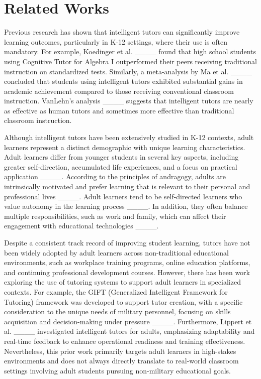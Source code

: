 \section{Related Works}
Previous research has shown that intelligent tutors can significantly improve learning outcomes, particularly in K-12 settings, where their use is often mandatory. For example, Koedinger et al. ____ found that high school students using Cognitive Tutor for Algebra I outperformed their peers receiving traditional instruction on standardized tests. Similarly, a meta-analysis by Ma et al. ____ concluded that students using intelligent tutors exhibited substantial gains in academic achievement compared to those receiving conventional classroom instruction. VanLehn's analysis ____ suggests that intelligent tutors are nearly as effective as human tutors and sometimes more effective than traditional classroom instruction. 

Although intelligent tutors have been extensively studied in K-12 contexts, adult learners represent a distinct demographic with unique learning characteristics. Adult learners differ from younger students in several key aspects, including greater self-direction, accumulated life experiences, and a focus on practical application ____. According to the principles of andragogy, adults are intrinsically motivated and prefer learning that is relevant to their personal and professional lives ____. Adult learners tend to be self-directed learners who value autonomy in the learning process ____. In addition, they often balance multiple responsibilities, such as work and family, which can affect their engagement with educational technologies ____.

Despite a consistent track record of improving student learning, tutors have not been widely adopted by adult learners across non-traditional educational environments, such as workplace training programs, online education platforms, and continuing professional development courses. However, there has been work exploring the use of tutoring systems to support adult learners in specialized contexts. For example, the GIFT (Generalized Intelligent  Framework for Tutoring) framework was developed to support tutor creation, with a specific consideration to the unique needs of military personnel, focusing on skills acquisition and decision-making under pressure ____. Furthermore, Lippert et al. ____ investigated intelligent tutors for adults, emphasizing adaptability and real-time feedback to enhance operational readiness and training effectiveness. Nevertheless, this prior work primarily targets adult learners in high-stakes environments and does not always directly translate to real-world classroom settings involving adult students pursuing non-military educational goals.

